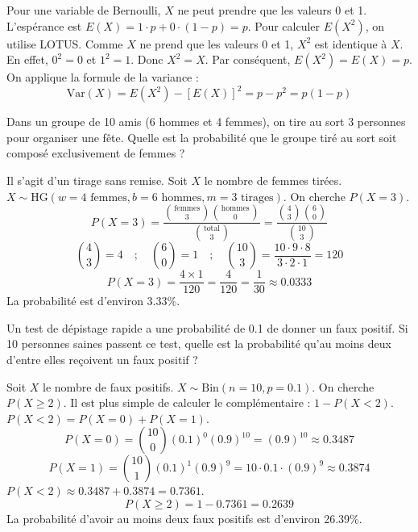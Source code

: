 \begin{correctionbox}
Pour une variable de Bernoulli, $X$ ne peut prendre que les valeurs 0 et 1.
L'espérance est $E(X) = 1 \cdot p + 0 \cdot (1-p) = p$.
Pour calculer $E(X^2)$, on utilise LOTUS. Comme $X$ ne prend que les valeurs 0 et 1, $X^2$ est identique à $X$.
En effet, $0^2=0$ et $1^2=1$. Donc $X^2=X$.
Par conséquent, $E(X^2) = E(X) = p$.
On applique la formule de la variance :
$$ \text{Var}(X) = E(X^2) - [E(X)]^2 = p - p^2 = p(1-p) $$
\end{correctionbox}

\begin{exercicebox}
Dans un groupe de 10 amis (6 hommes et 4 femmes), on tire au sort 3 personnes pour organiser une fête. Quelle est la probabilité que le groupe tiré au sort soit composé exclusivement de femmes ?
\end{exercicebox}

\begin{correctionbox}
Il s'agit d'un tirage sans remise. Soit $X$ le nombre de femmes tirées.
$X \sim \text{HG}(w=4 \text{ femmes}, b=6 \text{ hommes}, m=3 \text{ tirages})$.
On cherche $P(X=3)$.
$$ P(X=3) = \frac{\binom{\text{femmes}}{3} \binom{\text{hommes}}{0}}{\binom{\text{total}}{3}} = \frac{\binom{4}{3} \binom{6}{0}}{\binom{10}{3}} $$
$$ \binom{4}{3} = 4 \quad ; \quad \binom{6}{0} = 1 \quad ; \quad \binom{10}{3} = \frac{10 \cdot 9 \cdot 8}{3 \cdot 2 \cdot 1} = 120 $$
$$ P(X=3) = \frac{4 \times 1}{120} = \frac{4}{120} = \frac{1}{30} \approx 0.0333 $$
La probabilité est d'environ 3.33\%.
\end{correctionbox}

\begin{exercicebox}
Un test de dépistage rapide a une probabilité de 0.1 de donner un faux positif. Si 10 personnes saines passent ce test, quelle est la probabilité qu'au moins deux d'entre elles reçoivent un faux positif ?
\end{exercicebox}

\begin{correctionbox}
Soit $X$ le nombre de faux positifs. $X \sim \text{Bin}(n=10, p=0.1)$.
On cherche $P(X \ge 2)$. Il est plus simple de calculer le complémentaire : $1 - P(X < 2)$.
$P(X < 2) = P(X=0) + P(X=1)$.
$$ P(X=0) = \binom{10}{0}(0.1)^0(0.9)^{10} = (0.9)^{10} \approx 0.3487 $$
$$ P(X=1) = \binom{10}{1}(0.1)^1(0.9)^9 = 10 \cdot 0.1 \cdot (0.9)^9 \approx 0.3874 $$
$P(X < 2) \approx 0.3487 + 0.3874 = 0.7361$.
$$ P(X \ge 2) = 1 - 0.7361 = 0.2639 $$
La probabilité d'avoir au moins deux faux positifs est d'environ 26.39\%.
\end{correctionbox}

